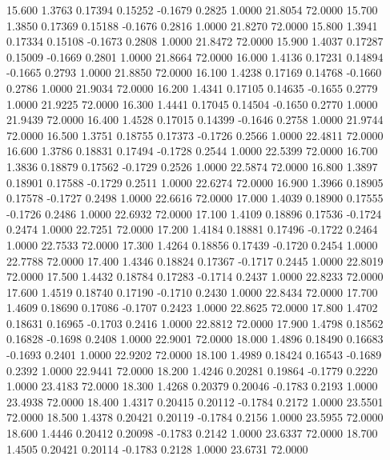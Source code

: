   15.600   1.3763   0.17394   0.15252  -0.1679   0.2825   1.0000  21.8054  72.0000
  15.700   1.3850   0.17369   0.15188  -0.1676   0.2816   1.0000  21.8270  72.0000
  15.800   1.3941   0.17334   0.15108  -0.1673   0.2808   1.0000  21.8472  72.0000
  15.900   1.4037   0.17287   0.15009  -0.1669   0.2801   1.0000  21.8664  72.0000
  16.000   1.4136   0.17231   0.14894  -0.1665   0.2793   1.0000  21.8850  72.0000
  16.100   1.4238   0.17169   0.14768  -0.1660   0.2786   1.0000  21.9034  72.0000
  16.200   1.4341   0.17105   0.14635  -0.1655   0.2779   1.0000  21.9225  72.0000
  16.300   1.4441   0.17045   0.14504  -0.1650   0.2770   1.0000  21.9439  72.0000
  16.400   1.4528   0.17015   0.14399  -0.1646   0.2758   1.0000  21.9744  72.0000
  16.500   1.3751   0.18755   0.17373  -0.1726   0.2566   1.0000  22.4811  72.0000
  16.600   1.3786   0.18831   0.17494  -0.1728   0.2544   1.0000  22.5399  72.0000
  16.700   1.3836   0.18879   0.17562  -0.1729   0.2526   1.0000  22.5874  72.0000
  16.800   1.3897   0.18901   0.17588  -0.1729   0.2511   1.0000  22.6274  72.0000
  16.900   1.3966   0.18905   0.17578  -0.1727   0.2498   1.0000  22.6616  72.0000
  17.000   1.4039   0.18900   0.17555  -0.1726   0.2486   1.0000  22.6932  72.0000
  17.100   1.4109   0.18896   0.17536  -0.1724   0.2474   1.0000  22.7251  72.0000
  17.200   1.4184   0.18881   0.17496  -0.1722   0.2464   1.0000  22.7533  72.0000
  17.300   1.4264   0.18856   0.17439  -0.1720   0.2454   1.0000  22.7788  72.0000
  17.400   1.4346   0.18824   0.17367  -0.1717   0.2445   1.0000  22.8019  72.0000
  17.500   1.4432   0.18784   0.17283  -0.1714   0.2437   1.0000  22.8233  72.0000
  17.600   1.4519   0.18740   0.17190  -0.1710   0.2430   1.0000  22.8434  72.0000
  17.700   1.4609   0.18690   0.17086  -0.1707   0.2423   1.0000  22.8625  72.0000
  17.800   1.4702   0.18631   0.16965  -0.1703   0.2416   1.0000  22.8812  72.0000
  17.900   1.4798   0.18562   0.16828  -0.1698   0.2408   1.0000  22.9001  72.0000
  18.000   1.4896   0.18490   0.16683  -0.1693   0.2401   1.0000  22.9202  72.0000
  18.100   1.4989   0.18424   0.16543  -0.1689   0.2392   1.0000  22.9441  72.0000
  18.200   1.4246   0.20281   0.19864  -0.1779   0.2220   1.0000  23.4183  72.0000
  18.300   1.4268   0.20379   0.20046  -0.1783   0.2193   1.0000  23.4938  72.0000
  18.400   1.4317   0.20415   0.20112  -0.1784   0.2172   1.0000  23.5501  72.0000
  18.500   1.4378   0.20421   0.20119  -0.1784   0.2156   1.0000  23.5955  72.0000
  18.600   1.4446   0.20412   0.20098  -0.1783   0.2142   1.0000  23.6337  72.0000
  18.700   1.4505   0.20421   0.20114  -0.1783   0.2128   1.0000  23.6731  72.0000
